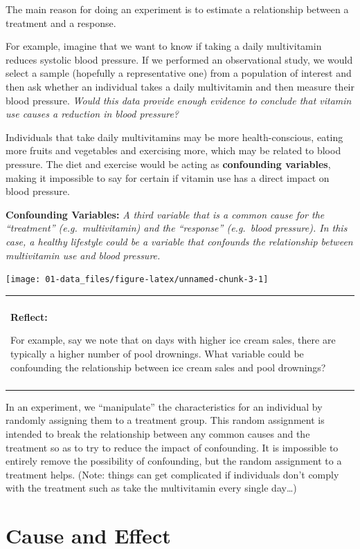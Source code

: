 \documentclass[
]{book}
\newenvironment{reflect}
{
    \begin{center}
    
    \begin{tabular}{|p{0.8\textwidth}|}
    \rowcolor{LightBlue}
    \hline\\
    \rowcolor{LightBlue}
    \textbf{Reflect:}
}
{
    \\\rowcolor{LightBlue}
    \\\hline
    \end{tabular} 
    \end{center}
}
\begin{document}
The main reason for doing an experiment is to estimate a relationship between a treatment and a response.

For example, imagine that we want to know if taking a daily multivitamin reduces systolic blood pressure. If we performed an observational study, we would select a sample (hopefully a representative one) from a population of interest and then ask whether an individual takes a daily multivitamin and then measure their blood pressure. \emph{Would this data provide enough evidence to conclude that vitamin use causes a reduction in blood pressure?}

Individuals that take daily multivitamins may be more health-conscious, eating more fruits and vegetables and exercising more, which may be related to blood pressure. The diet and exercise would be acting as \textbf{confounding variables}, making it impossible to say for certain if vitamin use has a direct impact on blood pressure.

\textbf{Confounding Variables:} \emph{A third variable that is a common cause for the ``treatment'' (e.g.~multivitamin) and the ``response'' (e.g.~blood pressure). In this case, a healthy lifestyle could be a variable that confounds the relationship between multivitamin use and blood pressure.}

\begin{center}\texttt{[image: 01-data\_files/figure-latex/unnamed-chunk-3-1]} \end{center}

\begin{reflect}
For example, say we note that on days with higher ice cream sales, there
are typically a higher number of pool drownings. What variable could be
confounding the relationship between ice cream sales and pool drownings?
\end{reflect}

In an experiment, we ``manipulate'' the characteristics for an individual by randomly assigning them to a treatment group. This random assignment is intended to break the relationship between any common causes and the treatment so as to try to reduce the impact of confounding. It is impossible to entirely remove the possibility of confounding, but the random assignment to a treatment helps. (Note: things can get complicated if individuals don't comply with the treatment such as take the multivitamin every single day\ldots)

\hypertarget{cause-and-effect}{%
\section{Cause and Effect}\label{cause-and-effect}}
\end{document}
